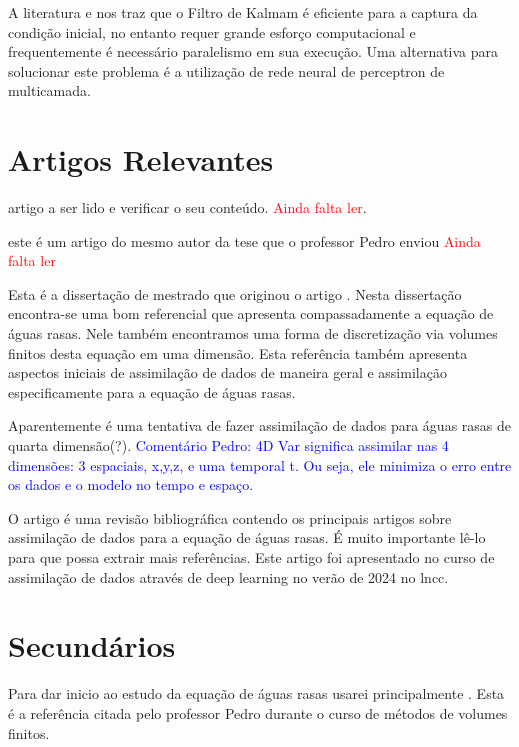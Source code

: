 \documentclass[12pt,a4paper]{article}
\begin{document}
	A literatura  \cite{HARTER20082621} e \cite{CampusVelhoHarter} nos traz que o Filtro de Kalmam é eficiente para a captura da condição inicial, no entanto requer grande esforço computacional e frequentemente é necessário paralelismo em sua execução. Uma alternativa para solucionar este problema é a utilização de rede neural de perceptron de  multicamada. 
	
	
	\section{Artigos Relevantes}
	
	\cite{kochkov2023neural} artigo a ser lido e verificar o seu conteúdo. \textcolor{red}{Ainda falta ler}.
	
	\cite{artigo2021fabioamaral} este é um artigo do mesmo autor da tese que o professor Pedro enviou \textcolor{red}{Ainda falta ler}
	
	\cite{disertacaoKhan} Esta é a dissertação de mestrado que originou o artigo \cite{kevlahan2019convergence}. Nesta dissertação encontra-se uma bom referencial que apresenta compassadamente a equação de águas rasas. Nele também encontramos uma forma de discretização via volumes finitos desta equação em uma dimensão. Esta referência também apresenta aspectos iniciais de assimilação de dados de maneira geral e assimilação especificamente para a equação de águas rasas.
	
	
	\cite{cstefuanescu2015pod} Aparentemente é uma tentativa de fazer assimilação de dados para águas rasas de quarta dimensão(?).
	\textcolor{blue}{Comentário Pedro: 4D Var significa assimilar nas 4 dimensões: 3 espaciais, x,y,z, e uma temporal t. Ou seja, ele minimiza o erro entre os dados e o modelo no tempo e espaço.}
	
	O artigo \cite{ghorbani2023data} é uma revisão bibliográfica contendo os principais artigos sobre assimilação de dados para a equação de águas rasas. É muito importante lê-lo para que possa extrair mais referências. Este artigo foi apresentado no curso de assimilação de dados através de deep learning no verão de 2024 no lncc.
	
	\section{Secundários}
	
	Para dar inicio ao estudo da equação de águas rasas usarei principalmente \cite{vallis2017atmospheric}. Esta é a referência citada pelo professor Pedro durante o curso de métodos de volumes finitos.
	
\end{document}
